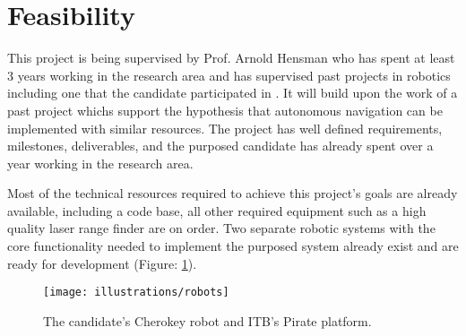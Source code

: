 \section{Feasibility}
\noindent
This project is being supervised by Prof. Arnold Hensman who has spent at least 3 years working in the research area and has supervised past projects in robotics including one that the candidate participated in \cite{JMD14}. It will build upon the work of a past project \cite{JMD14} whichs support the hypothesis that autonomous navigation can be implemented with similar resources. The project has well defined requirements, milestones, deliverables, and the purposed candidate has already spent over a year working in the research area. \newline

\noindent
Most of the technical resources required to achieve this project's goals are already available, including a code base, all other required equipment such as a high quality laser range finder are on order. Two separate robotic systems with the core functionality needed to implement the purposed system already exist and are ready for development (Figure: \ref{Figure: Robot Platforms.}). 
\newline

\begin{figure}[htbp]

\center \texttt{[image: illustrations/robots]}\\
\caption{The candidate's Cherokey robot and ITB's Pirate platform.} 
\label{Figure: Robot Platforms.}

\end{figure}
